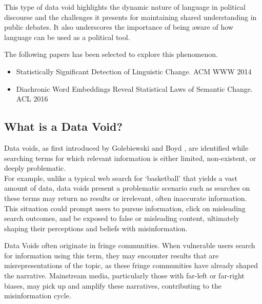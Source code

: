 This type of data void highlights the dynamic nature of language in political discourse and the challenges it presents for maintaining shared understanding in public debates.
It also underscores the importance of being aware of how language can be used as a political tool.



The following papers has been selected to explore this phenomenon.
\begin{itemize}
    \item Statistically Significant Detection of Linguistic Change.
    ACM WWW 2014 ~\cite{kulkarni2014statisticallysignificantdetectionlinguistic}
    \item Diachronic Word Embeddings Reveal Statistical Laws of Semantic Change.
    ACL 2016 ~\cite{hamilton-etal-2016-diachronic}
\end{itemize}

\subsection{What is a Data Void?}\label{subsec:what-is-a-data-void?}
Data voids, as first introduced by Golebiewski and Boyd \cite{unknown},
are identified while searching terms for which relevant information is either limited, non-existent, or deeply problematic.
\\
For example, unlike a typical web search for `basketball' that yields a vast amount of data,
data voids present a problematic scenario such as searches on these terms may return no results or irrelevant, often inaccurate information.
This situation could prompt users to pursue information, click on misleading search outcomes, and be exposed to false or misleading content,
ultimately shaping their perceptions and beliefs with misinformation.

Data Voids often originate in fringe communities.
When vulnerable users search for information using this term, they may encounter results that are misrepresentations of the topic, as these fringe communities have already shaped the narrative.
Mainstream media, particularly those with far-left or far-right biases, may pick up and amplify these narratives, contributing to the misinformation cycle.

